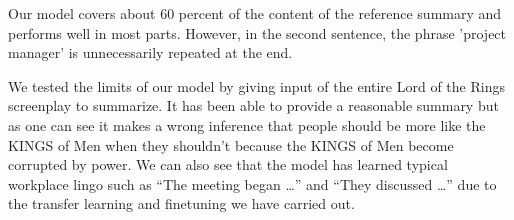 Our model covers about 60 percent of the content of the reference summary and performs well in most parts. However, in the second sentence, the phrase 'project manager' is unnecessarily repeated at the end.

%







We tested the limits of our model by giving input of the entire Lord of the Rings screenplay to summarize. It has been able to provide a reasonable summary but as one can see it makes a wrong inference that people should be more like the KINGS of Men when they shouldn’t because the KINGS of Men become corrupted by power. We can also see that the model has learned typical workplace lingo such as “The meeting began …” and “They discussed …” due to the transfer learning and finetuning we have carried out.




%


%

